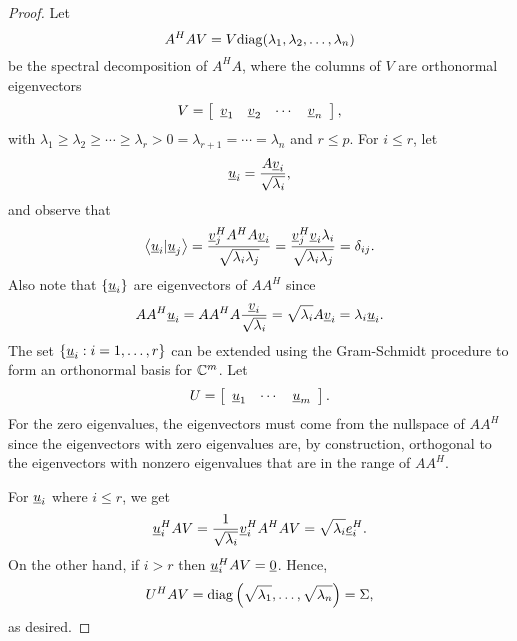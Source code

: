 \begin{proof}
Let
\begin{equation*}
A^H A V = V \mathrm{diag} ( \lambda_1, \lambda_2, \ldots, \lambda_n )
\end{equation*}
be the spectral decomposition of $A^H A$, where the columns of $V$ are orthonormal eigenvectors
\begin{equation*}
V = \left[ \begin{array}{cccc} \underline{v}_1 & \underline{v}_2 & \cdots & \underline{v}_n \end{array} \right], 
\end{equation*}
with $\lambda_1 \geq \lambda_2 \geq \cdots \geq \lambda_r > 0 = \lambda_{r+1} = \cdots = \lambda_{n}$ and $r \leq p$.
For $i \leq r$, let
\begin{equation*}
\underline{u}_i = \frac{A \underline{v}_i}{\sqrt{\lambda_i}},
\end{equation*}
and observe that
\begin{equation*}
\left\langle \underline{u}_i | \underline{u}_j \right\rangle
= \frac{\underline{v}_j^H A^H A \underline{v}_i}{\sqrt{\lambda_i \lambda_j}}
= \frac{\underline{v}_j^H \underline{v}_i \lambda_i}{\sqrt{\lambda_i \lambda_j}}
= \delta_{ij} .
\end{equation*}
Also note that $\{ \underline{u}_i \}$ are eigenvectors of $A A^H$ since
\begin{equation*}
A A^H \underline{u}_i
= A A^H A \frac{\underline{v}_i}{\sqrt{\lambda_i}}
= \sqrt{\lambda_i} A \underline{v}_i
= \lambda_i \underline{u}_i .
\end{equation*}
The set $\left\{ \underline{u}_i: i = 1, \ldots, r \right\}$ can be extended using the Gram-Schmidt procedure to form an orthonormal basis for $\mathbb{C}^m$.
Let
\begin{equation*}
U = \left[ \begin{array}{ccc} \underline{u}_1 & \cdots & \underline{u}_m \end{array} \right] .
\end{equation*}
For the zero eigenvalues, the eigenvectors must come from the nullspace of $A A^H$ since the eigenvectors with zero eigenvalues are, by construction, orthogonal to the eigenvectors with nonzero eigenvalues that are in the range of $A A^H$.

For $\underline{u}_i$ where $i \leq r$, we get
\begin{equation*}
\underline{u}_i^H A V 
= \frac{1}{\sqrt{\lambda_i}} \underline{v}_i^H A^H A V
= \sqrt{\lambda_i} \underline{e}_i^H .
\end{equation*}
On the other hand, if $i > r$ then $\underline{u}_i^H A V = \underline{0}$.
Hence,
\begin{equation*}
U^H A V = \mathrm{diag} \left( \sqrt{\lambda_1}, \ldots, \sqrt{\lambda_n} \right)
= \Sigma ,
\end{equation*}
as desired.
\end{proof}

